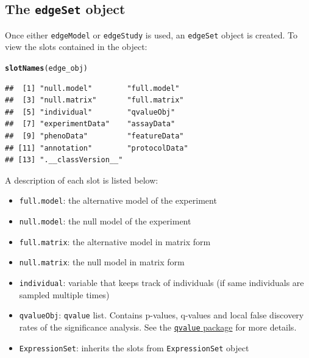 \documentclass{article}\usepackage[]{graphicx}\usepackage[]{color}
\makeatletter
\newcommand{\hlstd}[1]{\textcolor[rgb]{0.345,0.345,0.345}{#1}}%
\newcommand{\hlkwd}[1]{\textcolor[rgb]{0.737,0.353,0.396}{\textbf{#1}}}%
\newenvironment{kframe}{%
 \def\at@end@of@kframe{}%
 \ifinner\ifhmode%
  \def\at@end@of@kframe{\end{minipage}}%
  \begin{minipage}{\columnwidth}%
 \fi\fi%
 \def\FrameCommand##1{\hskip\@totalleftmargin \hskip-\fboxsep
 \colorbox{shadecolor}{##1}\hskip-\fboxsep
     \hskip-\linewidth \hskip-\@totalleftmargin \hskip\columnwidth}%
 \MakeFramed {\advance\hsize-\width
   \@totalleftmargin\z@ \linewidth\hsize
   \@setminipage}}%
 {\par\unskip\endMakeFramed%
 \at@end@of@kframe}
\newenvironment{knitrout}{}{} %
\makeatother
\begin{document}
\subsection{The {\tt edgeSet} object}
Once either {\tt edgeModel} or {\tt edgeStudy} is used, an {\tt edgeSet} object is created. To view the slots contained in the object:
\begin{knitrout}
\color{fgcolor}\begin{kframe}
\begin{alltt}
\hlkwd{slotNames}\hlstd{(edge_obj)}
\end{alltt}
\begin{verbatim}
##  [1] "null.model"        "full.model"       
##  [3] "null.matrix"       "full.matrix"      
##  [5] "individual"        "qvalueObj"        
##  [7] "experimentData"    "assayData"        
##  [9] "phenoData"         "featureData"      
## [11] "annotation"        "protocolData"     
## [13] ".__classVersion__"
\end{verbatim}
\end{kframe}
\end{knitrout}
A description of each slot is listed below: 
\begin{itemize}
\item {\tt full.model}: the alternative model of the experiment
\item {\tt null.model}: the null model of the experiment
\item {\tt full.matrix}: the alternative model in matrix form
\item {\tt null.matrix}: the null model in matrix form
\item {\tt individual}: variable that keeps track of individuals (if same individuals are sampled multiple times)
\item {\tt qvalueObj}: {\tt qvalue} list. Contains p-values, q-values and local false discovery rates of the significance analysis. See the \href{http://www.bioconductor.org/packages/release/bioc/html/qvalue.html}{{\tt qvalue} package} for more details.
\item {\tt ExpressionSet}: inherits the slots from {\tt ExpressionSet} object
\end{itemize}
\end{document}
